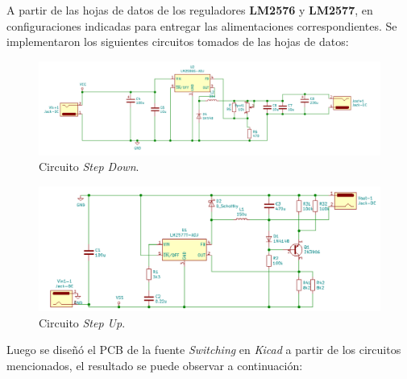 \par A partir de las hojas de datos de los reguladores \textbf{LM2576} y \textbf{LM2577}, en configuraciones indicadas para entregar las alimentaciones correspondientes. Se implementaron los siguientes circuitos tomados de las hojas de datos:\\

\vfill

\clearpage

\begin{figure}[H]
    \centering
    \includegraphics[width=0.95 \textwidth]{img/fuente/fuente_kicad_down.png}
    \caption{Circuito \textit{Step Down}.}
    \label{fig:step_down}
\end{figure}

\begin{figure}[H]
    \centering
    \includegraphics[width=0.95 \textwidth]{img/fuente/fuente_kicad_up.png}
    \caption{Circuito \textit{Step Up}.}
    \label{fig:step_up}
\end{figure}

\par Luego se diseñó el PCB de la fuente \textit{Switching} en \textit{Kicad} a partir de los circuitos mencionados, el resultado se puede observar a continuación:\\


\vfill

\clearpage





